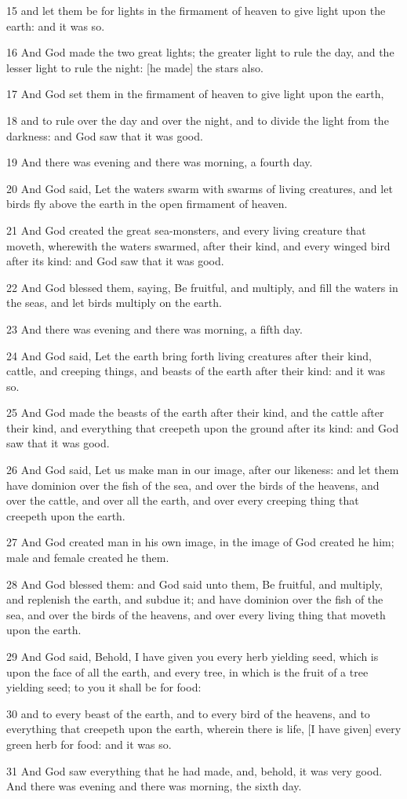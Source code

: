 \par 15 and let them be for lights in the firmament of heaven to give light upon the earth: and it was so.
\par 16 And God made the two great lights; the greater light to rule the day, and the lesser light to rule the night: [he made] the stars also.
\par 17 And God set them in the firmament of heaven to give light upon the earth,
\par 18 and to rule over the day and over the night, and to divide the light from the darkness: and God saw that it was good.
\par 19 And there was evening and there was morning, a fourth day.
\par 20 And God said, Let the waters swarm with swarms of living creatures, and let birds fly above the earth in the open firmament of heaven.
\par 21 And God created the great sea-monsters, and every living creature that moveth, wherewith the waters swarmed, after their kind, and every winged bird after its kind: and God saw that it was good.
\par 22 And God blessed them, saying, Be fruitful, and multiply, and fill the waters in the seas, and let birds multiply on the earth.
\par 23 And there was evening and there was morning, a fifth day.
\par 24 And God said, Let the earth bring forth living creatures after their kind, cattle, and creeping things, and beasts of the earth after their kind: and it was so.
\par 25 And God made the beasts of the earth after their kind, and the cattle after their kind, and everything that creepeth upon the ground after its kind: and God saw that it was good.
\par 26 And God said, Let us make man in our image, after our likeness: and let them have dominion over the fish of the sea, and over the birds of the heavens, and over the cattle, and over all the earth, and over every creeping thing that creepeth upon the earth.
\par 27 And God created man in his own image, in the image of God created he him; male and female created he them.
\par 28 And God blessed them: and God said unto them, Be fruitful, and multiply, and replenish the earth, and subdue it; and have dominion over the fish of the sea, and over the birds of the heavens, and over every living thing that moveth upon the earth.
\par 29 And God said, Behold, I have given you every herb yielding seed, which is upon the face of all the earth, and every tree, in which is the fruit of a tree yielding seed; to you it shall be for food:
\par 30 and to every beast of the earth, and to every bird of the heavens, and to everything that creepeth upon the earth, wherein there is life, [I have given] every green herb for food: and it was so.
\par 31 And God saw everything that he had made, and, behold, it was very good. And there was evening and there was morning, the sixth day.

